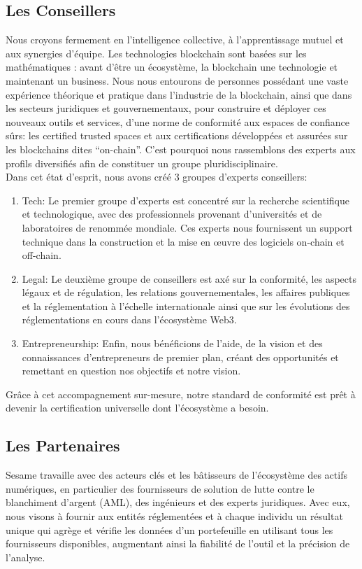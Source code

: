 ﻿\documentclass[a4paper]{article}
\let\OldTexttrademark\texttrademark
\renewcommand{\texttrademark}{\OldTexttrademark\xspace}%
\begin{document}
\subsection{Les Conseillers}
Nous croyons fermement en l’intelligence collective, à l'apprentissage mutuel et aux synergies d'équipe. Les technologies blockchain sont basées sur les mathématiques : avant d'être un écosystème, la blockchain une technologie et maintenant un business. Nous nous entourons de personnes possédant une vaste expérience théorique et pratique dans l'industrie de la blockchain, ainsi que dans les secteurs juridiques et gouvernementaux, pour construire et déployer ces nouveaux outils et services, d'une norme de conformité aux espaces de confiance sûrs:  les certified trusted spaces\texttrademark et aux certifications développées et assurées sur les blockchains dites “on-chain”. C'est pourquoi nous rassemblons des experts aux profils diversifiés afin de constituer un groupe pluridisciplinaire. \\

Dans cet état d’esprit, nous avons créé 3 groupes d’experts conseillers:

\begin{enumerate}
\item Tech: Le premier groupe d’experts est concentré sur la recherche scientifique et technologique, avec des professionnels provenant d'universités et de laboratoires de renommée mondiale. Ces experts nous fournissent un support technique dans la construction et la mise en œuvre des logiciels on-chain et off-chain.

\item Legal: Le deuxième groupe de conseillers est axé sur la conformité, les aspects légaux et de régulation, les relations gouvernementales, les affaires publiques et la réglementation à l'échelle internationale ainsi que sur les évolutions des réglementations en cours dans l'écosystème Web3.

\item Entrepreneurship: Enfin, nous bénéficions de l'aide, de la vision et des connaissances d'entrepreneurs de premier plan, créant des opportunités et remettant en question nos objectifs et notre vision.
\end{enumerate}

Grâce à cet accompagnement sur-mesure, notre standard de conformité est prêt à devenir la certification universelle dont l'écosystème a besoin.

\subsection{Les Partenaires}
Sesame travaille avec des acteurs clés et les bâtisseurs de l'écosystème des actifs numériques, en particulier des fournisseurs de solution de lutte contre le blanchiment d'argent (AML), des ingénieurs et des experts juridiques. Avec eux, nous visons à fournir aux entités réglementées et à chaque individu un résultat unique qui agrège et vérifie les données d'un portefeuille en utilisant tous les fournisseurs disponibles, augmentant ainsi la fiabilité de l’outil et la précision de l’analyse.
\end{document}
